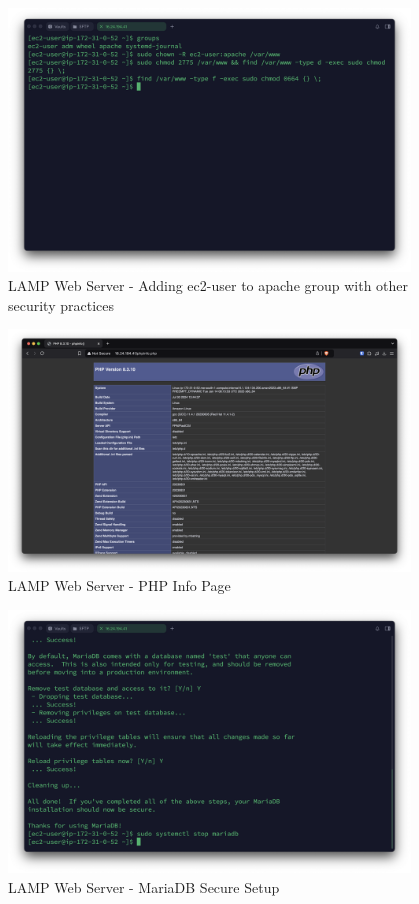 \documentclass[a4paper,12pt]{article}
\begin{document}
\begin{figure}[H]
    \centering
    \includegraphics[width=0.95\textwidth]{lamp-server-2.png}
    \caption{LAMP Web Server - Adding ec2-user to apache group with other security practices}
    \label{fig:lamp2}
\end{figure}

\begin{figure}[H]
    \centering
    \includegraphics[width=0.95\textwidth]{lamp-server-3.png}
    \caption{LAMP Web Server - PHP Info Page}
    \label{fig:lamp3}
\end{figure}

\begin{figure}[H]
    \centering
    \includegraphics[width=0.95\textwidth]{lamp-server-4.png}
    \caption{LAMP Web Server - MariaDB Secure Setup}
    \label{fig:lamp4}
\end{figure}
\end{document}
